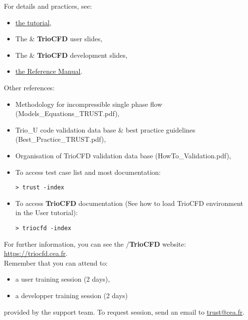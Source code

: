 For details and practices, see:
\begin{itemize}
\item \href{TRUST_tutorial.pdf}{the \trust tutorial},
\item The \trust \& \textbf{TrioCFD} user slides,
\item The \trust \& \textbf{TrioCFD} development slides,
\item \href{\REFERENCEMANUAL}{the \trustref Reference Manual}.
\end{itemize}

Other references:
\begin{itemize}
\item Methodology for incompressible single phase flow (Models\_Equations\_TRUST.pdf),
\item Trio\_U code validation data base \& best practice guidelines (Best\_Practice\_TRUST.pdf),
\item Organisation of TrioCFD validation data base (HowTo\_Validation.pdf),
\item To access \trust test case list and most documentation:
\begin{verbatim}
> trust -index
\end{verbatim}
\item To access \textbf{TrioCFD} documentation (See how to load TrioCFD environment in the User tutorial):
\begin{verbatim}
> triocfd -index
\end{verbatim}
\end{itemize}
\vspace{0.5cm}

For further information, you can see the \trust/\textbf{TrioCFD} website: \href{https://triocfd.cea.fr}{https://triocfd.cea.fr}.\\

Remember that you can attend to:
\begin{itemize}
\item a user training session (2 days),
\item a developper training session (2 days) 
\end{itemize}
provided by the support team.
To request session, send an email to \href{mailto:trust@cea.fr}{trust@cea.fr}.

